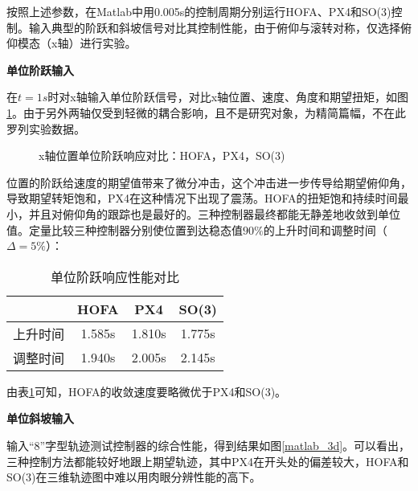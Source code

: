   按照上述参数，在Matlab中用0.005s的控制周期分别运行HOFA、PX4和SO(3)控制。输入典型的阶跃和斜坡信号对比其控制性能，由于俯仰与滚转对称，仅选择俯仰模态（x轴）进行实验。

  \textbf{单位阶跃输入}

  在$t=1s$时对x轴输入单位阶跃信号，对比x轴位置、速度、角度和期望扭矩，如图\ref{matlab_阶跃}。由于另外两轴仅受到轻微的耦合影响，且不是研究对象，为精简篇幅，不在此罗列实验数据。

  \begin{figure}[h]
    \centering
    \begin{minipage}[t]{0.33\textwidth}
      \centering
    \end{minipage}\hfill
    \begin{minipage}[t]{0.33\textwidth}
      \centering
    \end{minipage}\hfill
    \begin{minipage}[t]{0.33\textwidth}
      \centering
    \end{minipage}
    \caption{x轴位置单位阶跃响应对比：HOFA，PX4，SO(3)}
    \label{matlab_阶跃}
\end{figure}

位置的阶跃给速度的期望值带来了微分冲击，这个冲击进一步传导给期望俯仰角，导致期望转矩饱和，PX4在这种情况下出现了震荡。HOFA的扭矩饱和持续时间最小，并且对俯仰角的跟踪也是最好的。三种控制器最终都能无静差地收敛到单位值。定量比较三种控制器分别使位置到达稳态值$90\%$的上升时间和调整时间（$\Delta = 5\%$）：


\begin{table}[h]
  \centering
  \begin{tabular}{cccc}
      \toprule
      & HOFA & PX4 & SO(3) \\
      \midrule
    上升时间 & 1.585s & 1.810s & 1.775s\\
    调整时间 & 1.940s & 2.005s &2.145s \\
      \bottomrule
  \end{tabular}
  \caption{单位阶跃响应性能对比}
  \label{matlab阶跃对比}
\end{table}
由表\ref{matlab阶跃对比}可知，HOFA的收敛速度要略微优于PX4和SO(3)。

\textbf{单位斜坡输入}



  输入“8”字型轨迹测试控制器的综合性能，得到结果如图\ref{matlab_3d}。可以看出，三种控制方法都能较好地跟上期望轨迹，其中PX4在开头处的偏差较大，HOFA和SO(3)在三维轨迹图中难以用肉眼分辨性能的高下。

